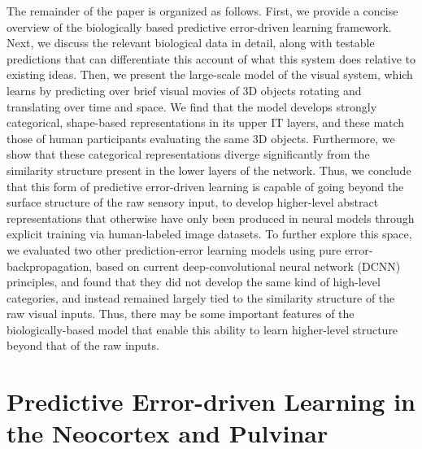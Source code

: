 \documentclass[11pt,twoside]{article}
\newif\myifpdf
\begin{document}
The remainder of the paper is organized as follows.  First, we provide a concise overview of the biologically based predictive error-driven learning framework.  Next, we discuss the relevant biological data in detail, along with testable predictions that can differentiate this account of what this system does relative to existing ideas.  Then, we present the large-scale model of the visual system, which learns by predicting over brief visual movies of 3D objects rotating and translating over time and space.  We find that the model develops strongly categorical, shape-based representations in its upper IT layers, and these match those of human participants evaluating the same 3D objects.  Furthermore, we show that these categorical representations diverge significantly from the similarity structure present in the lower layers of the network.  Thus, we conclude that this form of predictive error-driven learning is capable of going beyond the surface structure of the raw sensory input, to develop higher-level abstract representations that otherwise have only been produced in neural models through explicit training via human-labeled image datasets.  To further explore this space, we evaluated two other prediction-error learning models using pure error-backpropagation, based on current deep-convolutional neural network (DCNN) principles, and found that they did not develop the same kind of high-level categories, and instead remained largely tied to the similarity structure of the raw visual inputs.  Thus, there may be some important features of the biologically-based model that enable this ability to learn higher-level structure beyond that of the raw inputs.


\section{Predictive Error-driven Learning in the Neocortex and Pulvinar}
\end{document}
